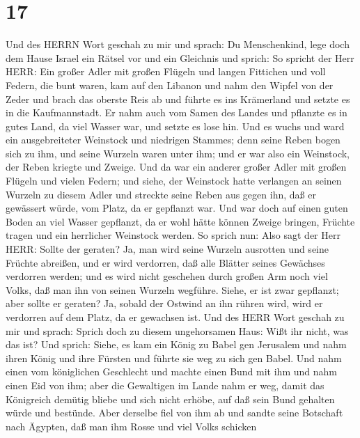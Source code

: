 \hypertarget{section-16}{%
\section{17}\label{section-16}}

 Und des HERRN Wort geschah zu mir und sprach: 
Du Menschenkind, lege doch dem Hause Israel ein Rätsel vor und ein
Gleichnis  und sprich: So spricht der Herr HERR: Ein großer
Adler mit großen Flügeln und langen Fittichen und voll Federn, die bunt
waren, kam auf den Libanon und nahm den Wipfel von der Zeder
 und brach das oberste Reis ab und führte es ins Krämerland
und setzte es in die Kaufmannstadt.  Er nahm auch vom Samen
des Landes und pflanzte es in gutes Land, da viel Wasser war, und setzte
es lose hin.  Und es wuchs und ward ein ausgebreiteter
Weinstock und niedrigen Stammes; denn seine Reben bogen sich zu ihm, und
seine Wurzeln waren unter ihm; und er war also ein Weinstock, der Reben
kriegte und Zweige.  Und da war ein anderer großer Adler mit
großen Flügeln und vielen Federn; und siehe, der Weinstock hatte
verlangen an seinen Wurzeln zu diesem Adler und streckte seine Reben aus
gegen ihn, daß er gewässert würde, vom Platz, da er gepflanzt war.
 Und war doch auf einen guten Boden an viel Wasser
gepflanzt, da er wohl hätte können Zweige bringen, Früchte tragen und
ein herrlicher Weinstock werden.  So sprich nun: Also sagt
der Herr HERR: Sollte der geraten? Ja, man wird seine Wurzeln ausrotten
und seine Früchte abreißen, und er wird verdorren, daß alle Blätter
seines Gewächses verdorren werden; und es wird nicht geschehen durch
großen Arm noch viel Volks, daß man ihn von seinen Wurzeln wegführe.
 Siehe, er ist zwar gepflanzt; aber sollte er geraten? Ja,
sobald der Ostwind an ihn rühren wird, wird er verdorren auf dem Platz,
da er gewachsen ist.  Und des HERR Wort geschah zu mir und
sprach:  Sprich doch zu diesem ungehorsamen Haus: Wißt ihr
nicht, was das ist? Und sprich: Siehe, es kam ein König zu Babel gen
Jerusalem und nahm ihren König und ihre Fürsten und führte sie weg zu
sich gen Babel.  Und nahm einen vom königlichen Geschlecht
und machte einen Bund mit ihm und nahm einen Eid von ihm; aber die
Gewaltigen im Lande nahm er weg,  damit das Königreich
demütig bliebe und sich nicht erhöbe, auf daß sein Bund gehalten würde
und bestünde.  Aber derselbe fiel von ihm ab und sandte
seine Botschaft nach Ägypten, daß man ihm Rosse und viel Volks schicken
